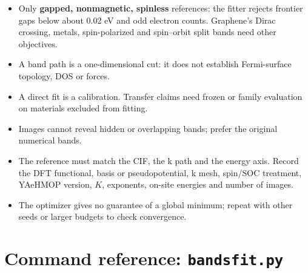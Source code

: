 \documentclass[11pt,a4paper]{article}
\newcommand{\cmd}[1]{\texttt{#1}}
\renewcommand{\_}{\origunderscore\allowbreak}
\begin{document}
\begin{itemize}
  \item Only \textbf{gapped, nonmagnetic, spinless} references: the fitter rejects frontier gaps below
        about 0.02 eV and odd electron counts. Graphene's Dirac crossing, metals, spin-polarized and
        spin--orbit split bands need other objectives.
  \item A band path is a one-dimensional cut: it does not establish Fermi-surface topology, DOS or
        forces.
  \item A direct fit is a calibration. Transfer claims need frozen or family evaluation on materials
        excluded from fitting.
  \item Images cannot reveal hidden or overlapping bands; prefer the original numerical bands.
  \item The reference must match the CIF, the k path and the energy axis. Record the DFT functional,
        basis or pseudopotential, k mesh, spin/SOC treatment, YAeHMOP version, $K$, exponents, on-site
        energies and number of images.
  \item The optimizer gives no guarantee of a global minimum; repeat with other seeds or larger budgets
        to check convergence.
\end{itemize}

\section{Command reference: \cmd{bands\_fit.py}}\label{sec:cmdref}
\end{document}
